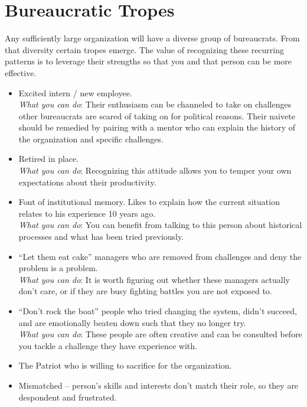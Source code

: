 \section{Bureaucratic Tropes\label{sec:tropes}}

Any sufficiently large organization will have a diverse group of bureaucrats. From that diversity certain tropes emerge. The value of recognizing these recurring patterns is to leverage their strengths so that you and that person can be more effective. 

\begin{itemize}
    \item Excited intern / new employee. \\
    \textit{What you can do}: Their enthusiasm can be channeled to take on challenges other bureaucrats are scared of taking on for political reasons. Their naivete should be remedied by pairing with a mentor who can explain the history of the organization and specific challenges.
    \item Retired in place. \\
    \textit{What you can do}: Recognizing this attitude allows you to temper your own expectations about their productivity. 
    \item Font of institutional memory. Likes to explain how the current situation relates to his experience 10 years ago. \\
    \textit{What you can do}: You can benefit from talking to this person about historical processes and what has been tried previously. 
    \item ``Let them eat cake'' managers who are removed from challenges and deny the problem is a problem. \\
    \textit{What you can do}: It is worth figuring out whether these managers actually don't care, or if they are busy fighting battles you are not exposed to.
    \item ``Don't rock the boat'' people who tried changing the system, didn't succeed, and are emotionally beaten down such that they no longer try. \\
    \textit{What you can do}: These people are often creative and can be consulted before you tackle a challenge they have experience with. 
    \item The Patriot who is willing to sacrifice for the organization. 
    \item Mismatched -- person's skills and interests don't match their role, so they are despondent and frustrated. \\

\end{itemize}
